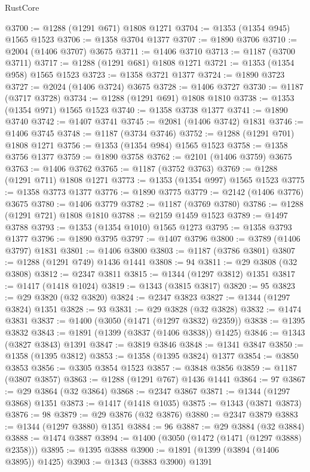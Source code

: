 \begin{lexlean}{RustCore}
\begin{coremodule}
@3700 := @1288 (@1291 @671) @1808 @1271
@3704 := @1353 (@1354 @945) @1565 @1523
@3706 := @1358 @3704 @1377
@3707 := @1890 @3706
@3710 := @2004 (@1406 @3707) @3675
@3711 := @1406 @3710
@3713 := @1187 (@3700 @3711)
@3717 := @1288 (@1291 @681) @1808 @1271
@3721 := @1353 (@1354 @958) @1565 @1523
@3723 := @1358 @3721 @1377
@3724 := @1890 @3723
@3727 := @2024 (@1406 @3724) @3675
@3728 := @1406 @3727
@3730 := @1187 (@3717 @3728)
@3734 := @1288 (@1291 @691) @1808 @1810
@3738 := @1353 (@1354 @971) @1565 @1523
@3740 := @1358 @3738 @1377
@3741 := @1890 @3740
@3742 := @1407 @3741
@3745 := @2081 (@1406 @3742) @1831
@3746 := @1406 @3745
@3748 := @1187 (@3734 @3746)
@3752 := @1288 (@1291 @701) @1808 @1271
@3756 := @1353 (@1354 @984) @1565 @1523
@3758 := @1358 @3756 @1377
@3759 := @1890 @3758
@3762 := @2101 (@1406 @3759) @3675
@3763 := @1406 @3762
@3765 := @1187 (@3752 @3763)
@3769 := @1288 (@1291 @711) @1808 @1271
@3773 := @1353 (@1354 @997) @1565 @1523
@3775 := @1358 @3773 @1377
@3776 := @1890 @3775
@3779 := @2142 (@1406 @3776) @3675
@3780 := @1406 @3779
@3782 := @1187 (@3769 @3780)
@3786 := @1288 (@1291 @721) @1808 @1810
@3788 := @2159 @1459 @1523
@3789 := @1497 @3788
@3793 := @1353 (@1354 @1010) @1565 @1273
@3795 := @1358 @3793 @1377
@3796 := @1890 @3795
@3797 := @1407 @3796
@3800 := @3789 (@1406 @3797) @1831
@3801 := @1406 @3800
@3803 := @1187 (@3786 @3801)
@3807 := @1288 (@1291 @749) @1436 @1441
@3808 := 94
@3811 := @29 @3808 (@32 @3808)
@3812 := @2347 @3811
@3815 := @1344 (@1297 @3812) @1351
@3817 := @1417 (@1418 @1024)
@3819 := @1343 (@3815 @3817)
@3820 := 95
@3823 := @29 @3820 (@32 @3820)
@3824 := @2347 @3823
@3827 := @1344 (@1297 @3824) @1351
@3828 := 93
@3831 := @29 @3828 (@32 @3828)
@3832 := @1474 @3831
@3837 := @1400 (@3050 (@1471 (@1297 @3832) @2359))
@3838 := @1395 @3832
@3843 := @1891 (@1399 (@3837 (@1406 @3838)) @1425)
@3846 := @1343 (@3827 @3843) @1391
@3847 := @3819 @3846
@3848 := @1341 @3847
@3850 := @1358 (@1395 @3812)
@3853 := @1358 (@1395 @3824) @1377
@3854 := @3850 @3853
@3856 := @3305 @3854 @1523
@3857 := @3848 @3856
@3859 := @1187 (@3807 @3857)
@3863 := @1288 (@1291 @767) @1436 @1441
@3864 := 97
@3867 := @29 @3864 (@32 @3864)
@3868 := @2347 @3867
@3871 := @1344 (@1297 @3868) @1351
@3873 := @1417 (@1418 @1035)
@3875 := @1343 (@3871 @3873)
@3876 := 98
@3879 := @29 @3876 (@32 @3876)
@3880 := @2347 @3879
@3883 := @1344 (@1297 @3880) @1351
@3884 := 96
@3887 := @29 @3884 (@32 @3884)
@3888 := @1474 @3887
@3894 := @1400 (@3050 (@1472 (@1471 (@1297 @3888) @2358)))
@3895 := @1395 @3888
@3900 := @1891 (@1399 (@3894 (@1406 @3895)) @1425)
@3903 := @1343 (@3883 @3900) @1391

\end{coremodule}
\end{lexlean}
